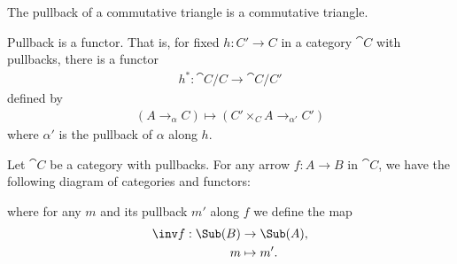 \documentclass{article}
\begin{document}
\begin{corollary}[Awodey p. 96]
    The pullback of a commutative triangle is a commutative triangle.

    \begin{center}
    \end{center}
\end{corollary}

\begin{proposition}
    Pullback is a functor. That is, for fixed $h:C'\to C$ in a category $\cat C$ with pullbacks,
    there is a functor
    \begin{align*}
        h^*:\cat C/C \to \cat C/C'
    \end{align*}
    defined by
    \begin{align*}
        (A\to_\alpha C)\mapsto (C'\times_C A\to_{\alpha'}C')
    \end{align*}
    where $\alpha'$ is the pullback of $\alpha$ along $h$.
\end{proposition}

\begin{corollary}[Awodey p. 97]
    Let $\cat C$ be a category with pullbacks. For any arrow $f:A\to B$
    in $\cat C$, we have the following diagram of categories and functors:
    \begin{center}
    \end{center}
    where for any $m$ and its pullback $m'$ along $f$ we define
    the map
    \begin{align*}
        \inv f: \Sub(B) & \to\Sub(A), \\
        m               & \mapsto m'.
    \end{align*}
\end{corollary}
\end{document}
